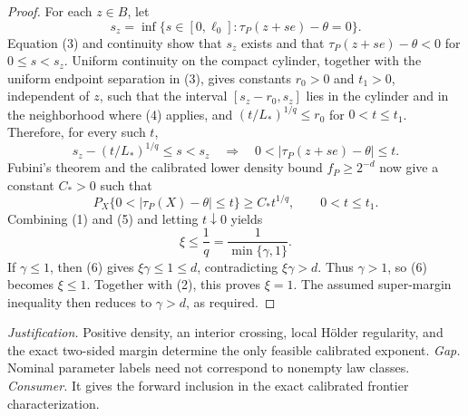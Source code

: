\documentclass{article}
\begin{document}
\begin{proof}
For each \(z\in B\), let
\[
s_z=\inf\{s\in[0,\ell_0]:\tau_P(z+se)-\theta=0\}.
\]
Equation (3) and continuity show that \(s_z\) exists and that \(\tau_P(z+se)-\theta<0\) for \(0\le s<s_z\). Uniform continuity on the compact cylinder, together with the uniform endpoint separation in (3), gives constants \(r_0>0\) and \(t_1>0\), independent of \(z\), such that the interval \([s_z-r_0,s_z]\) lies in the cylinder and in the neighborhood where (4) applies, and \((t/L_*)^{1/q}\le r_0\) for \(0<t\le t_1\). Therefore, for every such \(t\),
\[
s_z-(t/L_*)^{1/q}\le s<s_z
\quad\Longrightarrow\quad
0<|\tau_P(z+se)-\theta|\le t.
\]
Fubini's theorem and the calibrated lower density bound \(f_P\ge2^{-d}\) now give a constant \(C_*>0\) such that
\[
P_X\{0<|\tau_P(X)-\theta|\le t\}
\ge C_*t^{1/q},
\qquad 0<t\le t_1.
\tag{5}
\]
Combining (1) and (5) and letting \(t\downarrow0\) yields
\[
\xi\le\frac1q=\frac1{\min\{\gamma,1\}}.
\tag{6}
\]
If \(\gamma\le1\), then (6) gives \(\xi\gamma\le1\le d\), contradicting \(\xi\gamma>d\). Thus \(\gamma>1\), so (6) becomes \(\xi\le1\). Together with (2), this proves \(\xi=1\). The assumed super-margin inequality then reduces to \(\gamma>d\), as required.
\end{proof}
\par\smallskip\noindent \textit{Justification.} Positive density, an interior crossing, local Hölder regularity, and the exact two-sided margin determine the only feasible calibrated exponent. \textit{Gap.} Nominal parameter labels need not correspond to nonempty law classes. \textit{Consumer.} It gives the forward inclusion in the exact calibrated frontier characterization.
\end{document}
